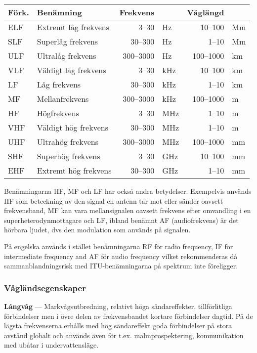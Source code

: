 \begin{tabular}{llrlrl}
\textbf{Förk.} & \textbf{Benämning}   & \textbf{Frekvens}& & \textbf{Våglängd} & \\ \hline
ELF            & Extremt låg frekvens & 3--30 &Hz          & 10--100 &Mm        \\
SLF            & Superlåg frekvens    & 30--300 &Hz        & 1--10 &Mm          \\
ULF            & Ultralåg frekvens    & 300--3000 &Hz      & 100--1000 &km      \\
VLF            & Väldigt låg frekvens & 3--30 &kHz         & 10--100 &km        \\
LF             & Låg frekvens         & 30--300 &kHz       & 1--10 &km          \\
MF             & Mellanfrekvens       & 300--3000 &kHz     & 100--1000 &m       \\
HF             & Högfrekvens          & 3--30 &MHz         & 1--10 &m           \\
VHF            & Väldigt hög frekvens & 30--300 &MHz       & 1--10 &m           \\
UHF            & Ultrahög frekvens    & 300--3000 &MHz     & 100--1000 &mm      \\
SHF            & Superhög frekvens    & 3--30 &GHz         & 10--100 &mm        \\
EHF            & Extremt hög frekvens & 30--300 &GHz       & 1--10 &mm          \\
\end{tabular}

Benämningarna HF, MF och LF har också andra betydelser. Exempelvis an\-vänd\-s HF som beteckning av den signal en antenn tar mot eller sänder oavsett frekvensband, MF kan vara mellansignalen oavsett frekvens efter omvandling i en superheterodynmottagare och LF, ibland benämnt AF (audiofrekvens) är det hörbara ljudet, dvs den modulation som används på signalen.

På engelska används i stället benämningarna RF för radio frequency, IF för intermediate frequency and AF för audio frequency vilket rekommenderas då sammanblandningsrisk med ITU-benämningarna på spektrum inte föreligger.

\subsubsection{Vågländsegenskaper}

\textbf{Långvåg} --- Markvågsutbredning, relativt höga sändareffekter, tillförlitliga förbindelser men i övre delen av frekvensbandet kortare förbindelser dagtid. På de lägsta frekvenserna erhålls med hög sändareffekt goda förbindelser på stora avstånd globalt och används även för t.ex. malmprospektering, kommunikation med ubåtar i undervattensläge.


